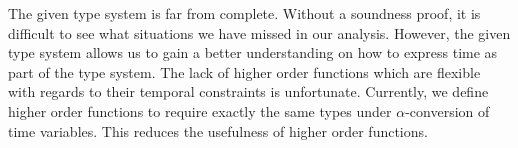 The given type system is far from complete.
Without a soundness proof, it is difficult to see what situations we have missed in our analysis.
However, the given type system allows us to gain a better understanding on how to express time as part of the type system.
The lack of higher order functions which are flexible with regards to their temporal constraints is unfortunate.
Currently, we define higher order functions to require exactly the same types under $\alpha$-conversion of time variables.
This reduces the usefulness of higher order functions.

